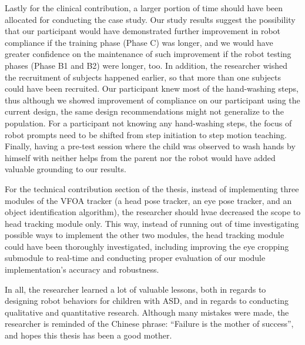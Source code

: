 Lastly for the clinical contribution, a larger portion of time should have been allocated for conducting the case study.  Our study results suggest the possibility that our participant would have demonstrated further improvement in robot compliance if the training phase (Phase C) was longer, and we would have greater confidence on the maintenance of such improvement if the robot testing phases (Phase B1 and B2) were longer, too.  In addition, the researcher wished the recruitment of subjects happened earlier, so that more than one subjects could have been recruited.  Our participant knew most of the hand-washing steps, thus although we showed improvement of compliance on our participant using the current design, the same design recommendations might not generalize to the population.  For a participant not knowing any hand-washing steps, the focus of robot prompts need to be shifted from step initiation to step motion teaching.  Finally, having a pre-test session where the child was observed to wash hands by himself with neither helps from the parent nor the robot would have added valuable grounding to our results.

For the technical contribution section of the thesis, instead of implementing three modules of the VFOA tracker (a head pose tracker, an eye pose tracker, and an object identification algorithm), the researcher should hvae decreased the scope to head tracking module only.  This way, instead of running out of time investigating possible ways to implement the other two modules, the head tracking module could have been thoroughly investigated, including improving the eye cropping submodule to real-time and conducting proper evaluation of our module implementation's accuracy and robustness.

In all, the researcher learned a lot of valuable lessons, both in regards to designing robot behaviors for children with ASD, and in regards to conducting qualitative and quantitative research.  Although many mistakes were made, the researcher is reminded of the Chinese phrase: ``Failure is the mother of success'', and hopes this thesis has been a good mother.